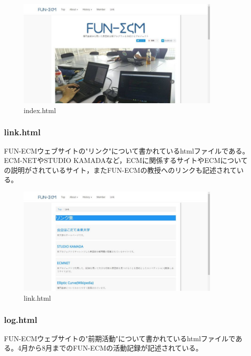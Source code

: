 \documentclass[openany,11pt,papersize]{jsbook}
\begin{document}
\begin{figure}[H]
  \begin{center} %
    \includegraphics[clip, width=10.0cm]{./figure/index.png}
    \caption{index.html} %
    \label{index} %
  \end{center}
\end{figure}

\subsubsection{link.html}
FUN-ECMウェブサイトの"リンク"について書かれているhtmlファイルである。ECM-NETやSTUDIO KAMADAなど，ECMに関係するサイトやECMについての説明がされているサイト，またFUN-ECMの教授へのリンクも記述されている。

\begin{figure}[H]
  \begin{center} %
    \includegraphics[clip, width=10.0cm]{./figure/link.png}
    \caption{link.html} %
    \label{link} %
  \end{center}
\end{figure}

\subsubsection{log.html}
FUN-ECMウェブサイトの"前期活動"について書かれているhtmlファイルである。4月から8月までのFUN-ECMの活動記録が記述されている。
\end{document}
